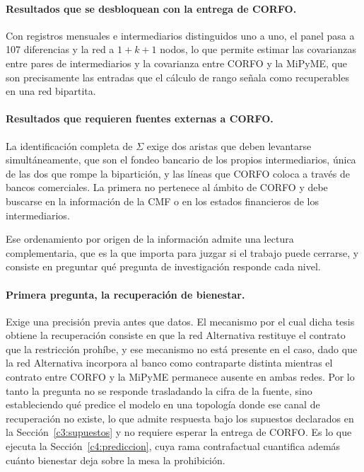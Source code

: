 \paragraph{Resultados que se desbloquean con la entrega de CORFO.} Con registros mensuales e intermediarios distinguidos uno a uno, el panel pasa a 107 diferencias y la red a $1+k+1$ nodos, lo que permite estimar las covarianzas entre pares de intermediarios y la covarianza entre CORFO y la MiPyME, que son precisamente las entradas que el cálculo de rango señala como recuperables en una red bipartita.

\paragraph{Resultados que requieren fuentes externas a CORFO.} La identificación completa de $\Sigma$ exige dos aristas que deben levantarse simultáneamente, que son el fondeo bancario de los propios intermediarios, única de las dos que rompe la bipartición, y las líneas que CORFO coloca a través de bancos comerciales. La primera no pertenece al ámbito de CORFO y debe buscarse en la información de la CMF o en los estados financieros de los intermediarios.

Ese ordenamiento por origen de la información admite una lectura complementaria,
que es la que importa para juzgar si el trabajo puede cerrarse, y consiste en
preguntar qué pregunta de investigación responde cada nivel.

\paragraph{Primera pregunta, la recuperación de bienestar.} Exige una precisión
previa antes que datos. El mecanismo por el cual dicha tesis obtiene la
recuperación consiste en que la red Alternativa restituye el contrato que la
restricción prohíbe, y ese mecanismo no está presente en el caso, dado que la red
Alternativa incorpora al banco como contraparte distinta mientras el contrato
entre CORFO y la MiPyME permanece ausente en ambas redes. Por lo tanto la
pregunta no se responde trasladando la cifra de la fuente, sino estableciendo qué
predice el modelo en una topología donde ese canal de recuperación no existe, lo
que admite respuesta bajo los supuestos declarados en la
Sección~\ref{c3:supuestos} y no requiere esperar la entrega de CORFO. Es lo que
ejecuta la Sección~\ref{c4:prediccion}, cuya rama contrafactual cuantifica además
cuánto bienestar deja sobre la mesa la prohibición.

